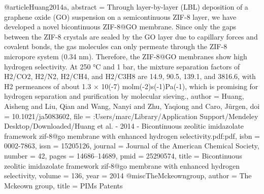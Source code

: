 @article{Huang2014a,
abstract = {Through layer-by-layer (LBL) deposition of a graphene oxide (GO) suspension on a semicontinuous ZIF-8 layer, we have developed a novel bicontinuous ZIF-8@GO membrane. Since only the gaps between the ZIF-8 crystals are sealed by the GO layer due to capillary forces and covalent bonds, the gas molecules can only permeate through the ZIF-8 micropore system (0.34 nm). Therefore, the ZIF-8@GO membranes show high hydrogen selectivity. At 250 °C and 1 bar, the mixture separation factors of H2/CO2, H2/N2, H2/CH4, and H2/C3H8 are 14.9, 90.5, 139.1, and 3816.6, with H2 permeances of about 1.3 × 10(-7) mol{\textperiodcentered}m(-2){\textperiodcentered}s(-1){\textperiodcentered}Pa(-1), which is promising for hydrogen separation and purification by molecular sieving.},
author = {Huang, Aisheng and Liu, Qian and Wang, Nanyi and Zhu, Yaqiong and Caro, J{\"{u}}rgen},
doi = {10.1021/ja5083602},
file = {:Users/marc/Library/Application Support/Mendeley Desktop/Downloaded/Huang et al. - 2014 - Bicontinuous zeolitic imidazolate framework zif-8@go membrane with enhanced hydrogen selectivity.pdf:pdf},
isbn = {0002-7863},
issn = {15205126},
journal = {Journal of the American Chemical Society},
number = {42},
pages = {14686--14689},
pmid = {25290574},
title = {{Bicontinuous zeolitic imidazolate framework zif-8@go membrane with enhanced hydrogen selectivity}},
volume = {136},
year = {2014}
}
@misc{TheMckeowngroup,
author = {{The Mckeown group}},
title = {{PIMs Patents}}
}
